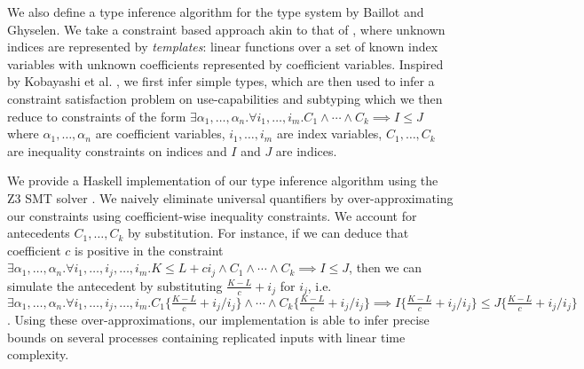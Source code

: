 We also define a type inference algorithm for the type system by Baillot and Ghyselen. We take a constraint based approach akin to that of \cite{HofmannAndJost2003,HofmannAndHoffmann2010,HoffmannEtAl2012,KobayashiEtAl2000,Kobayashi2005,Lhoussaine2004}, where unknown indices are represented by \textit{templates}: linear functions over a set of known index variables with unknown coefficients represented by coefficient variables. Inspired by  Kobayashi et al. \cite{KobayashiEtAl2000}, we first infer simple types, which are then used to infer a constraint satisfaction problem on use-capabilities and subtyping which we then reduce to constraints of the form $\exists\alpha_1,\dots,\alpha_n.\forall i_1,\dots,i_m.C_1\land\cdots\land C_k \implies I \leq J$ where $\alpha_1,\dots,\alpha_n$ are coefficient variables, $i_1,\dots,i_m$ are index variables, $C_1,\dots,C_k$ are inequality constraints on indices and $I$ and $J$ are indices.

We provide a Haskell implementation of our type inference algorithm using the Z3 SMT solver \cite{Z3}. We naively eliminate universal quantifiers by over-approximating our constraints using coefficient-wise inequality constraints. We account for antecedents $C_1,\dots,C_k$ by substitution. For instance, if we can deduce that coefficient $c$ is positive in the constraint $\exists\alpha_1,\dots,\alpha_n.\forall i_1,\dots,i_j,\dots,i_m.K \leq L + ci_j \land C_1 \land \cdots \land C_k \implies I \leq J$, then we can simulate the antecedent by substituting $\frac{K-L}{c} + i_j$ for $i_j$, i.e. $\exists\alpha_1,\dots,\alpha_n.\forall i_1,\dots,i_j,\dots,i_m.C_1\{\frac{K-L}{c} + i_j/i_j\} \land \cdots \land C_k\{\frac{K-L}{c} + i_j/i_j\} \implies I\{\frac{K-L}{c} + i_j/i_j\} \leq J\{\frac{K-L}{c} + i_j/i_j\}$. Using these over-approximations, our implementation is able to infer precise bounds on several processes containing replicated inputs with linear time complexity.


